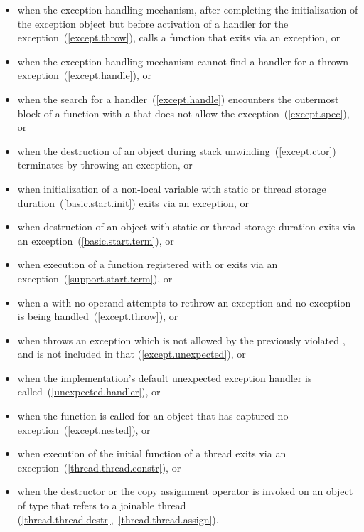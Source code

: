 %
\begin{itemize}
\item%
when the exception handling mechanism, after completing
the initialization of the exception object
but before
activation of a handler for the exception~(\ref{except.throw}),
calls a function that exits
via an exception, or

\item%
when the exception handling mechanism cannot find a handler for a thrown exception~(\ref{except.handle}), or

\item when the search for a handler~(\ref{except.handle}) encounters the
outermost block of a function with a 
that does not allow the exception~(\ref{except.spec}), or

\item%
when the destruction of an object during stack unwinding~(\ref{except.ctor})
terminates by throwing an exception, or

\item%
when initialization of a non-local
variable with static or thread storage duration~(\ref{basic.start.init})
exits via an exception, or

\item%
when destruction of an object with static or thread storage duration exits
via an exception~(\ref{basic.start.term}), or

\item%
when execution of a function registered with
 or 
exits via an exception~(\ref{support.start.term}), or

\item%
when a
with no operand attempts to rethrow an exception and no exception is being
handled~(\ref{except.throw}), or

\item%
when
throws an exception which is not allowed by the previously violated
,
and
is not included in that
 (\ref{except.unexpected}), or

\item%
when the implementation's default
unexpected exception handler
is called~(\ref{unexpected.handler}), or

\item%
when the function  is called for an object
that has captured no exception~(\ref{except.nested}), or

\item%
when execution of the initial function of a thread exits via
an exception~(\ref{thread.thread.constr}), or

\item%
when the destructor or the copy assignment operator is invoked on an object
of type  that refers to a joinable thread
(\ref{thread.thread.destr},~\ref{thread.thread.assign}).

\end{itemize}

